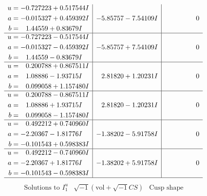 \documentclass[1p]{elsarticle_modified}
\theoremstyle{definition}
\newcommand{\I}{\sqrt{-1}}
\begin{document}
$$\begin{array}{c|c|c}
\begin{aligned}
u &= -0.727223 + 0.517544 I \\
a &= -0.015327 + 0.459392 I \\
b &= \phantom{-}1.44559 + 0.83679 I\end{aligned}
 & -5.85757 - 7.54109 I & \phantom{-0.000000 } 0 \\ \hline\begin{aligned}
u &= -0.727223 - 0.517544 I \\
a &= -0.015327 - 0.459392 I \\
b &= \phantom{-}1.44559 - 0.83679 I\end{aligned}
 & -5.85757 + 7.54109 I & \phantom{-0.000000 } 0 \\ \hline\begin{aligned}
u &= \phantom{-}0.200788 + 0.867511 I \\
a &= \phantom{-}1.08886 - 1.93715 I \\
b &= \phantom{-}0.099058 + 1.157480 I\end{aligned}
 & \phantom{-}2.81820 + 1.20231 I & \phantom{-0.000000 } 0 \\ \hline\begin{aligned}
u &= \phantom{-}0.200788 - 0.867511 I \\
a &= \phantom{-}1.08886 + 1.93715 I \\
b &= \phantom{-}0.099058 - 1.157480 I\end{aligned}
 & \phantom{-}2.81820 - 1.20231 I & \phantom{-0.000000 } 0 \\ \hline\begin{aligned}
u &= \phantom{-}0.492212 + 0.740960 I \\
a &= -2.20367 - 1.81776 I \\
b &= -0.101543 + 0.598383 I\end{aligned}
 & -1.38202 - 5.91758 I & \phantom{-0.000000 } 0 \\ \hline\begin{aligned}
u &= \phantom{-}0.492212 - 0.740960 I \\
a &= -2.20367 + 1.81776 I \\
b &= -0.101543 - 0.598383 I\end{aligned}
 & -1.38202 + 5.91758 I & \phantom{-0.000000 } 0\\
 \hline 
 \end{array}$$\newpage$$\begin{array}{c|c|c}  
\text{Solutions to }I^u_{1}& \I (\text{vol} + \sqrt{-1}CS) & \text{Cusp shape}\\
 \hline 
\begin{aligned}

\end{aligned}
\end{array}$$
\end{document}
